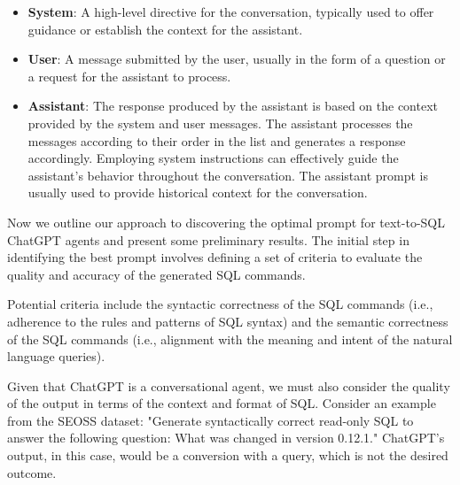 \begin{itemize}
    \item \textbf{System}: A high-level directive for the conversation, typically used to offer guidance or establish the context for the assistant.
    \item \textbf{User}: A message submitted by the user, usually in the form of a question or a request for the assistant to process.
    \item \textbf{Assistant}: The response produced by the assistant is based on the context provided by the system and user messages. The assistant processes the messages according to their order in the list and generates a response accordingly. Employing system instructions can effectively guide the assistant's behavior throughout the conversation. The assistant prompt is usually used to provide historical context for the conversation. 
\end{itemize}

Now we outline our approach to discovering the optimal prompt for text-to-SQL ChatGPT agents and present some preliminary results.
The initial step in identifying the best prompt involves defining a set of criteria to evaluate the quality and accuracy of the generated SQL commands.

Potential criteria include the syntactic correctness of the SQL commands (i.e., adherence to the rules and patterns of SQL syntax) and the semantic correctness of the SQL commands (i.e., alignment with the meaning and intent of the natural language queries).

Given that ChatGPT is a conversational agent, we must also consider the quality of the output in terms of the context and format of SQL.
Consider an example from the SEOSS dataset: "Generate syntactically correct read-only SQL to answer the following question: What was changed in version 0.12.1." ChatGPT's output, in this case, would be a conversion with a query, which is not the desired outcome.

